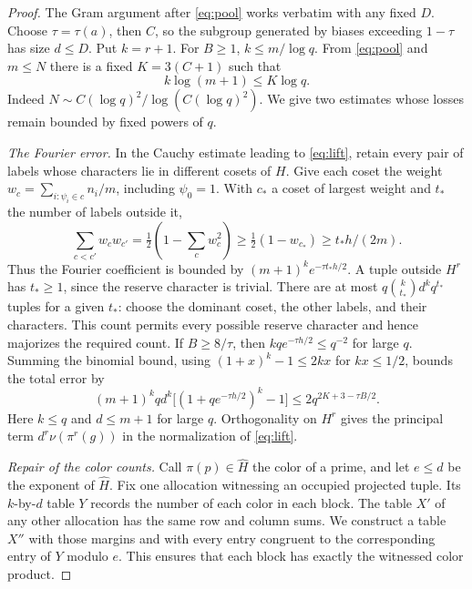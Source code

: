 \begin{proof}
The Gram argument after \eqref{eq:pool} works verbatim with any fixed \(D\). Choose \(\tau=\tau(a)\), then \(C\), so the subgroup generated by biases exceeding \(1-\tau\) has size \(d\le D\). Put \(k=r+1\). For \(B\ge1\), \(k\le m/\log q\). From \eqref{eq:pool} and \(m\le N\) there is a fixed \(K=3(C+1)\) such that
\begin{equation}\label{eq:growsize}
 k\log(m+1)\le K\log q .
\end{equation}
Indeed \(N\sim C(\log q)^2/\log(C(\log q)^2)\). We give two estimates whose losses remain bounded by fixed powers of \(q\).

\emph{The Fourier error.}
In the Cauchy estimate leading to \eqref{eq:lift}, retain every pair of labels whose characters lie in different cosets of \(H\). Give each coset the weight \(w_c=\sum_{i:\psi_i\in c}n_i/m\), including \(\psi_0=1\). With \(c_*\) a coset of largest weight and \(t_*\) the number of labels outside it,
\[
 \sum_{c<c'}w_cw_{c'}=\tfrac12(1-\textstyle\sum_c w_c^2)
 \ge \tfrac12(1-w_{c_*})\ge t_* h/(2m).
\]
Thus the Fourier coefficient is bounded by \((m+1)^k e^{-\tau t_* h/2}\). A tuple outside \(H^r\) has \(t_*\ge1\), since the reserve character is trivial. There are at most \(q\binom{k}{t_*}d^k q^{t_*}\) tuples for a given \(t_*\): choose the dominant coset, the other labels, and their characters. This count permits every possible reserve character and hence majorizes the required count. If \(B\ge8/\tau\), then \(kq e^{-\tau h/2}\le q^{-2}\) for large \(q\). Summing the binomial bound, using \((1+x)^k-1\le2kx\) for \(kx\le1/2\), bounds the total error by
\begin{equation}\label{eq:growerror}
 (m+1)^k q d^k\big[(1+q e^{-\tau h/2})^k-1\big]
 \le 2q^{2K+3-\tau B/2}.
\end{equation}
Here \(k\le q\) and \(d\le m+1\) for large \(q\). Orthogonality on \(H^r\) gives the principal term \(d^r\nu(\pi^r(g))\) in the normalization of \eqref{eq:lift}.

\emph{Repair of the color counts.}
Call \(\pi(p)\in\widehat H\) the color of a prime, and let \(e\le d\) be the exponent of \(\widehat H\). Fix one allocation witnessing an occupied projected tuple. Its \(k\)-by-\(d\) table \(Y\) records the number of each color in each block. The table \(X'\) of any other allocation has the same row and column sums. We construct a table \(X''\) with those margins and with every entry congruent to the corresponding entry of \(Y\) modulo \(e\). This ensures that each block has exactly the witnessed color product.


\end{proof}
